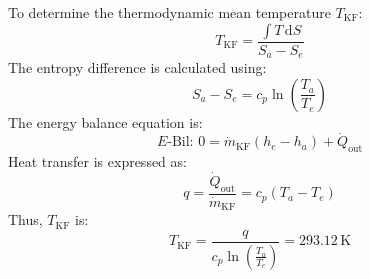 To determine the thermodynamic mean temperature \( T_{\text{KF}} \):  
\[
T_{\text{KF}} = \frac{\int T \, \text{d}S}{S_a - S_e}
\]  
The entropy difference is calculated using:  
\[
S_a - S_e = c_p \ln\left(\frac{T_a}{T_e}\right)
\]  
The energy balance equation is:  
\[
E\text{-Bil: } 0 = \dot{m}_{\text{KF}} (h_e - h_a) + \dot{Q}_{\text{out}}
\]  
Heat transfer is expressed as:  
\[
q = \frac{\dot{Q}_{\text{out}}}{\dot{m}_{\text{KF}}} = c_p (T_a - T_e)
\]  
Thus, \( T_{\text{KF}} \) is:  
\[
T_{\text{KF}} = \frac{q}{c_p \ln\left(\frac{T_a}{T_e}\right)} = 293.12 \, \text{K}
\]